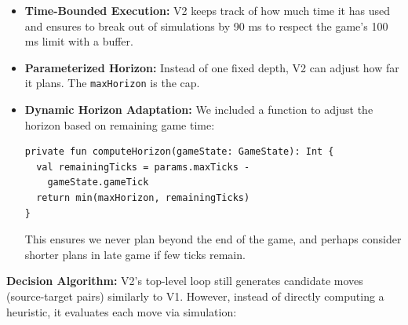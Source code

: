 \documentclass[conference]{IEEEtran}
\begin{document}
\begin{itemize}
\item \textbf{Time-Bounded Execution:} V2 keeps track of how much time it has used and ensures to break out of simulations by 90 ms to respect the game's 100 ms limit with a buffer.

\item \textbf{Parameterized Horizon:} Instead of one fixed depth, V2 can adjust how far it plans. The \texttt{maxHorizon} is the cap.

\item \textbf{Dynamic Horizon Adaptation:} We included a function to adjust the horizon based on remaining game time:

\begin{scriptsize}
\raggedright
\begin{verbatim}
private fun computeHorizon(gameState: GameState): Int {
  val remainingTicks = params.maxTicks - 
    gameState.gameTick
  return min(maxHorizon, remainingTicks)
}
\end{verbatim}
\end{scriptsize}

This ensures we never plan beyond the end of the game, and perhaps consider shorter plans in late game if few ticks remain.
\end{itemize}

\textbf{Decision Algorithm:} V2's top-level loop still generates candidate moves (source-target pairs) similarly to V1. However, instead of directly computing a heuristic, it evaluates each move via simulation:
\end{document}
